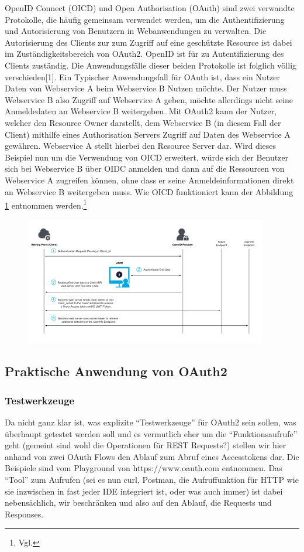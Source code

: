 \documentclass[notitlepage, hidelinks]{article}
\begin{document}
OpenID Connect (OICD) und Open Authorisation (OAuth) sind zwei verwandte Protokolle, die häufig gemeinsam verwendet werden, um die Authentifizierung und Autorisierung von Benutzern in Webanwendungen zu verwalten. Die Autorisierung des Clients zur zum Zugriff auf eine geschützte Resource ist dabei im Zuständigkeitsbereich von OAuth2. OpenID ist für zu Autentifizierung des Clients zuständig. Die Anwendungsfälle dieser beiden Protokolle ist folglich völlig verschieden[1]. Ein Typischer Anwendungsfall für OAuth ist, dass ein Nutzer Daten von Webservice A beim Webservice B Nutzen möchte. Der Nutzer muss Webservice B also Zugriff auf Webservice A geben, möchte allerdings nicht seine Anmeldedaten an Webservice B weitergeben. Mit OAuth2 kann der Nutzer, welcher den Resource Owner darstellt, dem Webservice B (in diesem Fall der Client) mithilfe eines Authorisation Servers Zugriff auf Daten des Webservice A gewähren. Webservice A stellt hierbei den Resource Server dar. Wird dieses Beispiel nun um die Verwendung von OICD erweitert, würde sich der Benutzer sich bei Webservice B über OIDC anmelden und dann auf die Ressourcen von Webservice A zugreifen können, ohne dass er seine Anmeldeinformationen direkt an Webservice B weitergeben muss. Wie OICD funktioniert kann der Abbildung \ref{fig:oicd} entnommen werden.\footnote{Vgl.\cite{oauth-difference}}


\begin{figure}[H]
\centering
  \includegraphics[width=400px]{images/oidc.png}
  \caption{}
  \label{fig:oicd}
\end{figure}


\subsection{Praktische Anwendung von OAuth2}
\subsubsection{Testwerkzeuge}
Da nicht ganz klar ist, was explizite ``Testwerkzeuge'' für OAuth2 sein sollen, was überhaupt getestet werden soll und es vermutlich eher um die ``Funktionsaufrufe'' geht (gemeint sind wohl die Operationen für REST Requests?) stellen wir hier anhand von zwei OAuth Flows den Ablauf zum Abruf eines Accesstokens dar. Die Beispiele sind vom Playground von https://www.oauth.com entnommen. Das ``Tool'' zum Aufrufen (sei es nun curl, Postman, die Aufruffunktion für HTTP wie sie inzwischen in fast jeder IDE integriert ist, oder was auch immer) ist dabei nebensächlich, wir beschränken und also auf den Ablauf, die Requests und Responses.
\end{document}
